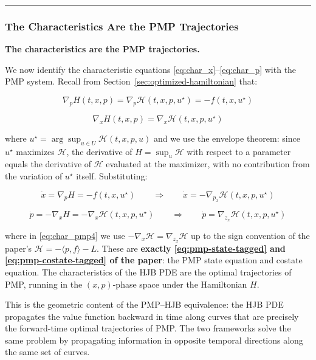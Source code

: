 \documentclass{article}
\begin{document}
\medskip\hrule\medskip

\subsubsection{The Characteristics Are the PMP Trajectories}
\begin{mathrequirementsbox}
\noindent\textbf{The characteristics are the PMP trajectories.}

We now identify the characteristic equations \eqref{eq:char_x}--\eqref{eq:char_p}
with the PMP system. Recall from Section~\ref{sec:optimized-hamiltonian} that:

\begin{equation}
    \nabla_p H(t, x, p) = \nabla_p \mathcal{H}(t, x, p, u^\star)
    = -f(t, x, u^\star)
\end{equation}

\begin{equation}
    \nabla_x H(t, x, p) = \nabla_x \mathcal{H}(t, x, p, u^\star)
\end{equation}

where $u^\star = \arg\sup_{u \in U} \mathcal{H}(t, x, p, u)$ and we use the
envelope theorem: since $u^\star$ maximizes $\mathcal{H}$, the derivative of
$H = \sup_u \mathcal{H}$ with respect to a parameter equals the derivative of
$\mathcal{H}$ evaluated at the maximizer, with no contribution from the
variation of $u^\star$ itself. Substituting:

\begin{equation}
    \dot{x} = \nabla_p H = -f(t, x, u^\star)
    \qquad \Longrightarrow \qquad
    \dot{x} = -\nabla_{p_x}\mathcal{H}(t, x, p, u^\star)
    \label{eq:char_pmp3}
\end{equation}

\begin{equation}
    \dot{p} = -\nabla_x H = -\nabla_x \mathcal{H}(t, x, p, u^\star)
    \qquad \Longrightarrow \qquad
    \dot{p} = \nabla_{z_x}\mathcal{H}(t, x, p, u^\star)
    \label{eq:char_pmp4}
\end{equation}

where in \eqref{eq:char_pmp4} we use $-\nabla_x\mathcal{H} =
\nabla_{z_x}\mathcal{H}$ up to the sign convention of the paper's $\mathcal{H}
= -\langle p, f\rangle - L$. These are \textbf{exactly \eqref{eq:pmp-state-tagged} and \eqref{eq:pmp-costate-tagged}
of the paper}: the PMP state equation and costate equation. The characteristics
of the HJB PDE are the optimal trajectories of PMP, running in the
$(x, p)$-phase space under the Hamiltonian $H$.

This is the geometric content of the PMP--HJB equivalence: the HJB PDE
propagates the value function backward in time along curves that are precisely
the forward-time optimal trajectories of PMP. The two frameworks solve the same
problem by propagating information in opposite temporal directions along the
same set of curves.
\end{mathrequirementsbox}
\end{document}
